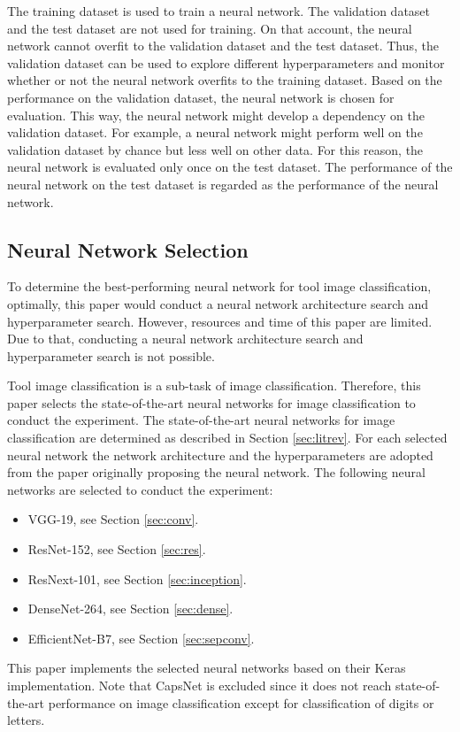 The training dataset is used to train a neural network. The validation dataset and the test dataset are not used for training. On that account, the neural network cannot overfit to the validation dataset and the test dataset. Thus, the validation dataset can be used to explore different hyperparameters and monitor whether or not the neural network overfits to the training dataset. Based on the performance on the validation dataset, the neural network is chosen for evaluation. This way, the neural network might develop a dependency on the validation dataset. For example, a neural network might perform well on the validation dataset by chance but less well on other data. For this reason, the neural network is evaluated only once on the test dataset. The performance of  the neural network on the test dataset is regarded as the performance of the neural network. \autocite{ElAmir.2020}



\subsection{Neural Network Selection}
To determine the best-performing neural network for tool image classification, optimally, this paper would conduct a neural network architecture search and hyperparameter search. However, resources and time of this paper are limited. Due to that, conducting a neural network architecture search and hyperparameter search is not possible. 
\par
Tool image classification is a sub-task of image classification. Therefore, this paper selects the state-of-the-art neural networks for image classification to conduct the experiment. The state-of-the-art neural networks for image classification are determined as described in Section \ref{sec:litrev}. For each selected neural network the network architecture and the hyperparameters are adopted from the paper originally proposing the neural network. The following neural networks are selected to conduct the experiment:
\begin{itemize}
	\item VGG-19, see Section \ref{sec:conv}. \autocite{Simonyan.2014}
	\item ResNet-152, see Section \ref{sec:res}. \autocite{He.2016}
	\item ResNext-101, see Section \ref{sec:inception}. \autocite{Xie.2017}
	\item DenseNet-264, see Section \ref{sec:dense}. \autocite{Huang.2017}
	\item EfficientNet-B7, see Section \ref{sec:sepconv}. \autocite{Tan.2019}
\end{itemize}
This paper implements the selected neural networks based on their Keras implementation.\autocite{KerasApp} Note that CapsNet is excluded since it does not reach state-of-the-art performance on image classification except for classification of digits or letters.



